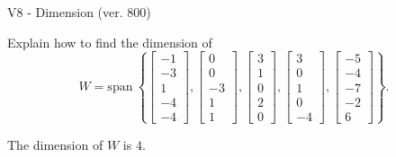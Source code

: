 \begin{exercise}
  \begin{exerciseTitle}V8 - Dimension (ver. 800)\end{exerciseTitle}
  \begin{exerciseStatement}
    Explain how to find the dimension of 
\[W=\mathrm{span}\ \left\{\left[\begin{array}{r}
-1 \\
-3 \\
1 \\
-4 \\
-4
\end{array}\right] , \left[\begin{array}{r}
0 \\
0 \\
-3 \\
1 \\
1
\end{array}\right] , \left[\begin{array}{r}
3 \\
1 \\
0 \\
2 \\
0
\end{array}\right] , \left[\begin{array}{r}
3 \\
0 \\
1 \\
0 \\
-4
\end{array}\right] , \left[\begin{array}{r}
-5 \\
-4 \\
-7 \\
-2 \\
6
\end{array}\right]\right\}.\]



  \end{exerciseStatement}
  \begin{exerciseAnswer}
   The dimension of \(W\) is  \(4\).
  


  \end{exerciseAnswer}
\end{exercise}